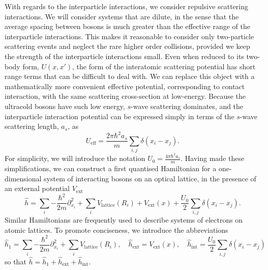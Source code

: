 \documentclass[a4paper,10pt]{article}
\theoremstyle{plain}
\begin{document}
With regards to the interparticle interactions, we consider repulsive scattering
interactions. We will consider systems that are dilute, in the sense that the
average spacing between bosons is much greater than the effective range of the
interparticle interactions. This makes it reasonable to consider only
two-particle scattering events and neglect the rare higher order collisions,
provided we keep the strength of the interparticle interactions small. Even when
reduced to its two-body form, $U(x,x')$, the form of the interatomic scattering
potential has short range terms that can be difficult to deal with. We can
replace this object with a mathematically more convenient effective potential,
corresponding to contact interaction, with the same scattering cross-section at
low-energy. Because the ultracold bosons have such low energy, $s$-wave
scattering dominates, and the interparticle interaction potential can be
expressed simply in terms of the $s$-wave scattering length, $a_{s}$, as
\begin{equation}
    U_{\text{eff}}
    =
    \frac{2 \pi\hbar^{2} a_{s}}{m}
    \sum_{i,j}{\delta(x_{i} - x_{j})}.
\end{equation}
For simplicity, we will introduce the notation $U_{0} = \frac{4 \pi \hbar^{2}
a_{s}}{m}$. Having made these simplifications, we can construct a first
quantised Hamiltonian for a one-dimensional system of interacting bosons on an
optical lattice, in the presence of an external potential $V_{\text{ext}}$
\begin{equation}
    \label{eq:HamiltonianCoordinateRepresentation}
    \hat{h}
    =
    \sum_{i}{-\frac{\hbar^{2}}{2m}  \partial_{x_{i}}^{2}} +
    \sum_{i}{V_{\text{lattice}}(R_{i})} +
    V_{\text{ext}}(x) +
    \frac{U_{0}}{2} \sum_{i,j}{\delta(x_{i} - x_{j})}.
\end{equation}
Similar Hamiltonians are frequently used to describe systems of electrons on
atomic lattices. To promote conciseness, we introduce the abbreviations
\begin{equation*}
    \hat{h}_{1}
    =
    \sum_{i}{-\frac{\hbar^{2}}{2m} \partial_{x_{i}}^{2}} +
    \sum_{i}{V_{\text{lattice}}(R_{i})},
    \quad
    \hat{h}_{\text{ext}}
    =
    V_{\text{ext}}(x),
    \quad
    \hat{h}_{\text{int}}
    =
    \frac{U_{0}}{2} \sum_{i,j}\delta{(x_{i}-x_{j})}
\end{equation*}
so that $\hat{h}=\hat{h}_1+\hat{h}_{\text{ext}}+\hat{h}_{\text{int}}$.
\end{document}

